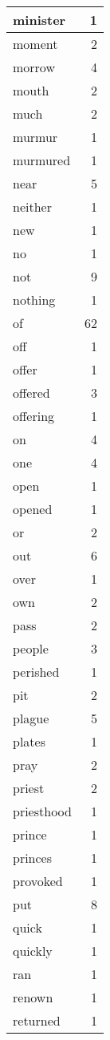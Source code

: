 \begin{center}
\begin{longtable}{l|r}
minister & 1 \\ \hline
moment & 2 \\ \hline
morrow & 4 \\ \hline
mouth & 2 \\ \hline
much & 2 \\ \hline
murmur & 1 \\ \hline
murmured & 1 \\ \hline
near & 5 \\ \hline
neither & 1 \\ \hline
new & 1 \\ \hline
no & 1 \\ \hline
not & 9 \\ \hline
nothing & 1 \\ \hline
of & 62 \\ \hline
off & 1 \\ \hline
offer & 1 \\ \hline
offered & 3 \\ \hline
offering & 1 \\ \hline
on & 4 \\ \hline
one & 4 \\ \hline
open & 1 \\ \hline
opened & 1 \\ \hline
or & 2 \\ \hline
out & 6 \\ \hline
over & 1 \\ \hline
own & 2 \\ \hline
pass & 2 \\ \hline
people & 3 \\ \hline
perished & 1 \\ \hline
pit & 2 \\ \hline
plague & 5 \\ \hline
plates & 1 \\ \hline
pray & 2 \\ \hline
priest & 2 \\ \hline
priesthood & 1 \\ \hline
prince & 1 \\ \hline
princes & 1 \\ \hline
provoked & 1 \\ \hline
put & 8 \\ \hline
quick & 1 \\ \hline
quickly & 1 \\ \hline
ran & 1 \\ \hline
renown & 1 \\ \hline
returned & 1 \\ \hline

\end{longtable}
\end{center}

